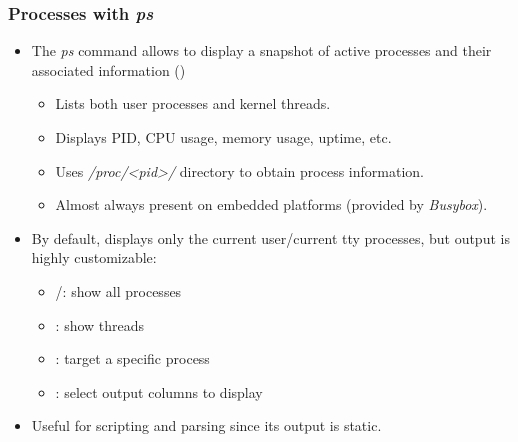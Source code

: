 \begin{frame}[fragile]
  \frametitle{Processes with {\em ps}}
  \begin{itemize}
    \item The {\em ps} command allows to display a snapshot of active processes and
          their associated information ()
    \begin{itemize}
      \item Lists both user processes and kernel threads.
      \item Displays PID, CPU usage, memory usage, uptime, etc.
    \end{itemize}
    \begin{itemize}
      \item Uses {\em /proc/<pid>/} directory to obtain process information.
      \item Almost always present on embedded platforms (provided by
            {\em Busybox}).
    \end{itemize}
    \item By default, displays only the current user/current tty processes,
      but output is highly customizable:
      \begin{itemize}
        \item {}/: show all processes
        \item {}: show threads
        \item {}: target a specific process
        \item {}: select output columns to display
      \end{itemize}
    \item Useful for scripting and parsing since its output is static.
  \end{itemize}
\end{frame}

